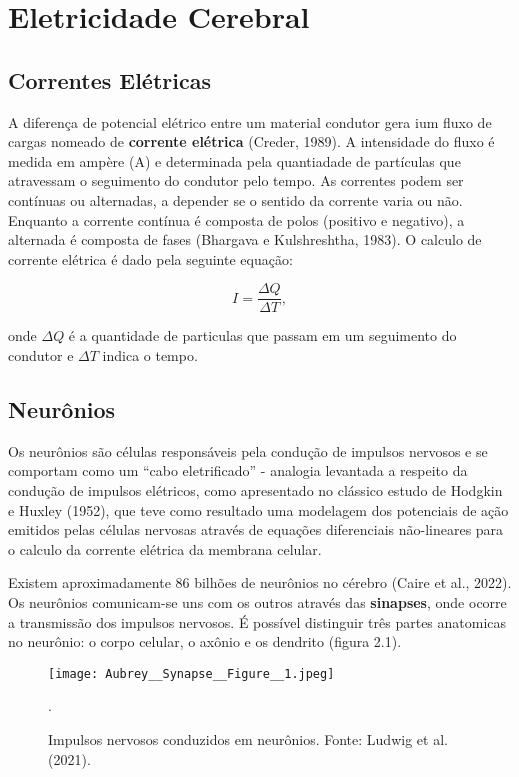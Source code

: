\chapter{Eletricidade Cerebral}



\section{Correntes Elétricas}
A diferença de potencial elétrico entre um material condutor gera ium fluxo de 
cargas nomeado de \textbf{corrente elétrica} (Creder, 1989).
A intensidade do fluxo é medida em ampère (A) e determinada pela quantiadade de partículas que atravessam o seguimento
do condutor pelo tempo. As correntes podem ser contínuas ou alternadas, a depender se o sentido da corrente varia ou não. Enquanto a corrente contínua 
é composta de polos (positivo e negativo), a alternada é composta de fases (Bhargava e Kulshreshtha, 1983). O calculo de corrente elétrica é 
dado pela seguinte equação:

\begin{equation}
    I = \frac{\Delta Q }{\Delta T},
\end{equation}

onde $\Delta Q$ é a quantidade de particulas que passam em um seguimento do condutor e $\Delta T$ indica o tempo. 

\section{Neurônios}
Os neurônios são células responsáveis pela condução de impulsos nervosos e se comportam como um “cabo eletrificado” - analogia
levantada a respeito da condução de impulsos elétricos, como apresentado no clássico estudo de Hodgkin e Huxley (1952), 
que teve como resultado uma modelagem dos potenciais de ação emitidos pelas células 
nervosas através de equações diferenciais não-lineares 
para o calculo da corrente elétrica da membrana celular. 

Existem aproximadamente 86 bilhões de neurônios no cérebro (Caire et al., 2022). Os neurônios comunicam-se uns com os outros através das \textbf{sinapses}, onde ocorre a transmissão dos impulsos nervosos. 
É possível distinguir três partes anatomicas no neurônio: o corpo celular, o axônio e os dendrito (figura 2.1).

\begin{figure}[h]
    \centering
    \texttt{[image: Aubrey\_\_Synapse\_\_Figure\_\_1.jpeg]}
    \caption[Impulsos nervosos conduzidos em neurônios]{Impulsos nervosos conduzidos em neurônios. Fonte: Ludwig et al. (2021).}.\label{fig:potencial}
    \end{figure}


